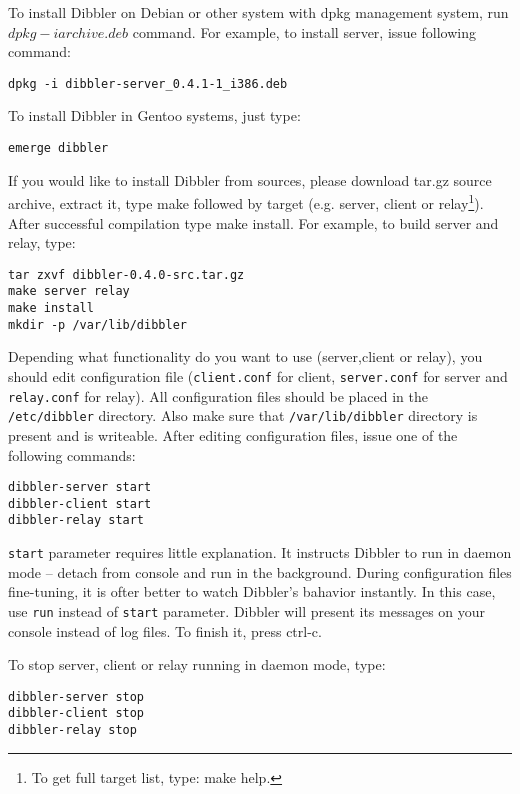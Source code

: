 To install Dibbler on Debian or other system with dpkg management
system, run $dpkg -i archive.deb$ command. For example, to install
server, issue following command:

\begin{verbatim}
dpkg -i dibbler-server_0.4.1-1_i386.deb
\end{verbatim}

To install Dibbler in Gentoo systems, just type:

\begin{verbatim}
emerge dibbler
\end{verbatim}

If you would like to install Dibbler from sources, please download tar.gz
source archive, extract it, type make followed by target (e.g. server,
client or relay\footnote{To get full target list, type: make help.}). 
After successful compilation type make install. For example, to build
server and relay, type:

\begin{verbatim}
tar zxvf dibbler-0.4.0-src.tar.gz
make server relay
make install
mkdir -p /var/lib/dibbler
\end{verbatim}

Depending what functionality do you want to use (server,client or relay),
you should edit configuration file (\verb+client.conf+ for client, \verb+server.conf+
for server and \verb+relay.conf+ for relay). All configuration files should
be placed in the \verb+/etc/dibbler+ directory. Also make sure that 
\verb+/var/lib/dibbler+ directory is present and is writeable. After
editing configuration files, issue one of the following commands:

\begin{verbatim}
dibbler-server start
dibbler-client start
dibbler-relay start
\end{verbatim}

\verb+start+ parameter requires little explanation. It
instructs Dibbler to run in daemon mode -- detach from console and run
in the background. During configuration files fine-tuning, it is ofter better
to watch Dibbler's bahavior instantly. In this case, use \verb+run+
instead of \verb+start+ parameter. Dibbler will present its messages on
your console instead of log files. To finish it, press ctrl-c.

To stop server, client or relay running in daemon mode, type:
\begin{verbatim}
dibbler-server stop
dibbler-client stop
dibbler-relay stop
\end{verbatim}


